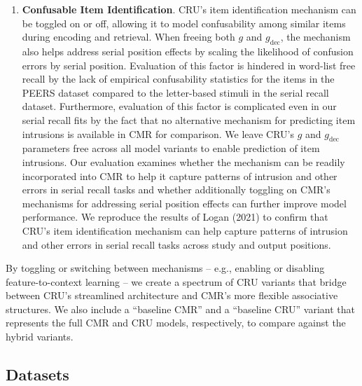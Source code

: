 \documentclass[
  letterpaper,
  11pt,
  english,
  singlespacing,
  headsepline]{MastersDoctoralThesis}
\begin{document}
\begin{enumerate}
  possible that in serial recall participants explicitly encode and
  retrieve an end-of-list marker as a signal that typing is done (Logan
  2018), but that in free recall participants instead attempt to
  continue recalling items until it is too difficult to do so or time
  runs out.
\item
  \textbf{Confusable Item Identification}. CRU's item identification
  mechanism can be toggled on or off, allowing it to model confusability
  among similar items during encoding and retrieval. When freeing both
  \(g\) and \(g_\text{dec}\), the mechanism also helps address serial
  position effects by scaling the likelihood of confusion errors by
  serial position. Evaluation of this factor is hindered in word-list
  free recall by the lack of empirical confusability statistics for the
  items in the PEERS dataset compared to the letter-based stimuli in the
  serial recall dataset. Furthermore, evaluation of this factor is
  complicated even in our serial recall fits by the fact that no
  alternative mechanism for predicting item intrusions is available in
  CMR for comparison. We leave CRU's \(g\) and \(g_\text{dec}\)
  parameters free across all model variants to enable prediction of item
  intrusions. Our evaluation examines whether the mechanism can be
  readily incorporated into CMR to help it capture patterns of intrusion
  and other errors in serial recall tasks and whether additionally
  toggling on CMR's mechanisms for addressing serial position effects
  can further improve model performance. We reproduce the results of
  Logan (2021) to confirm that CRU's item identification mechanism can
  help capture patterns of intrusion and other errors in serial recall
  tasks across study and output positions.
\end{enumerate}

By toggling or switching between mechanisms -- e.g., enabling or
disabling feature-to-context learning -- we create a spectrum of CRU
variants that bridge between CRU's streamlined architecture and CMR's
more flexible associative structures. We also include a ``baseline CMR''
and a ``baseline CRU'' variant that represents the full CMR and CRU
models, respectively, to compare against the hybrid variants.

\subsection{Datasets}\label{datasets-1}
\end{document}
